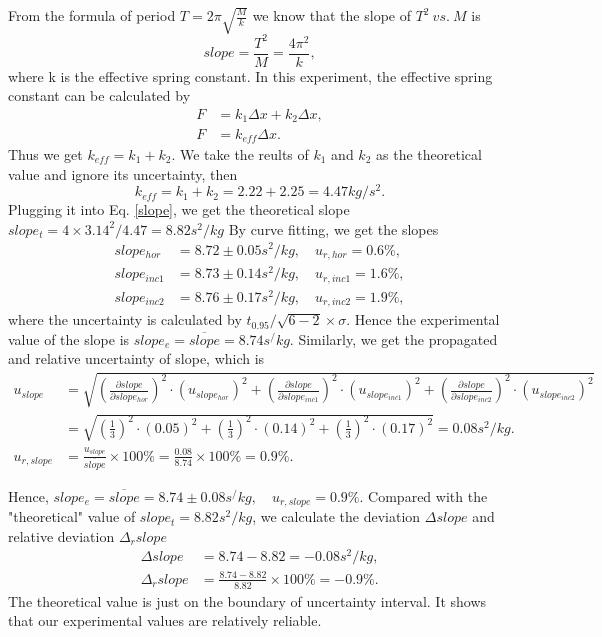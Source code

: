     From the formula of period $T=2\pi\sqrt{\frac{M}{k}}$ we know that the slope of $T^2\ vs.\ M$ is
    \begin{equation}\label{slope}
        slope=\frac{T^2}{M}=\frac{4\pi^2}{k},
    \end{equation}
    where k is the effective spring constant. In this experiment, the effective spring constant can be calculated by
    \[ 
    \begin{split}
        F&=k_1\Delta x+k_2\Delta x,\\
        F&=k_{eff}\Delta x.
    \end{split}
    \]
    Thus we get $k_{eff}=k_1+k_2$. We take the reults of $k_1$ and $k_2$ as the theoretical value and ignore its uncertainty, then
    \begin{equation}\label{keff}
        k_{eff}=k_1+k_2=2.22+2.25=4.47kg/s^2.
    \end{equation}
    Plugging it into Eq. \ref{slope}, we get the theoretical slope $slope_t=4\times 3.14^2/4.47=8.82s^2/kg$
    By curve fitting, we get the slopes
    \[
    \begin{split}
        slope_{hor}&=8.72\pm 0.05s^2/kg,\quad u_{r,hor}=0.6\%,\\
        slope_{inc1}&=8.73\pm 0.14s^2/kg,\quad u_{r,inc1}=1.6\%,\\
        slope_{inc2}&=8.76\pm 0.17s^2/kg,\quad u_{r,inc2}=1.9\%,
    \end{split}
    \]
    where the uncertainty is calculated by $t_0.95/\sqrt{6-2}\times \sigma$.
    Hence the experimental value of the slope is $slope_e=\overline{slope}=8.74s^/kg$.
    Similarly, we get the propagated and relative uncertainty of slope, which is
    \[
    \begin{split}
        u_{slope}&=\sqrt{(\frac{\partial slope}{\partial slope_{hor}})^2\cdot(u_{slope_{hor}})^2+(\frac{\partial slope}{\partial slope_{inc1}})^2\cdot(u_{slope_{inc1}})^2+(\frac{\partial slope}{\partial slope_{inc2}})^2\cdot(u_{slope_{inc2}})^2}\\
        &=\sqrt{(\frac{1}{3})^2\cdot(0.05)^2+(\frac{1}{3})^2\cdot(0.14)^2+(\frac{1}{3})^2\cdot(0.17)^2}=0.08s^2/kg.\\
        u_{r,slope}&=\frac{u_{slope}}{\overline{slope}}\times100\%=\frac{0.08}{8.74}\times100\%=0.9\%.
    \end{split}
    \]

    Hence, $slope_e=\overline{slope}=8.74\pm 0.08s^/kg, \quad u_{r,slope}=0.9\%$. Compared with the "theoretical" value of $slope_t=8.82s^2/kg$, we calculate the deviation $\Delta slope$ and relative deviation $\Delta_r slope$
    \[
    \begin{split}
        \Delta slope&=8.74-8.82=-0.08s^2/kg,\\
        \Delta_r slope&=\frac{8.74-8.82}{8.82}\times 100\%=-0.9\%.
    \end{split}
    \]
    The theoretical value is just on the boundary of uncertainty interval. It shows that our experimental values are relatively reliable.

